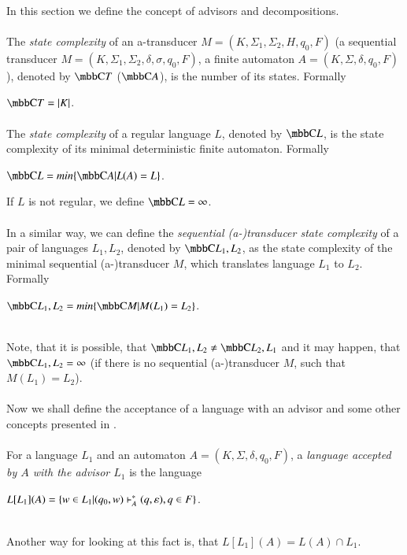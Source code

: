 \paragraph{}
In this section we define the concept of advisors and decompositions.

\paragraph{}
 The \emph{state complexity} of an a-transducer $M = (K, \Sigma_1, \Sigma_2, H, q_0, F)$ (a sequential transducer $M = (K, \Sigma_1, \Sigma_2, \delta, \sigma, q_0, F)$, a finite automaton $A = (K, \Sigma, \delta, q_0, F)$), denoted by $\C{T}$ ($\C{A}$), is the number of its states. Formally \\
\centerline{$\C{T} = |K|$.}

\paragraph{}
 The \emph{state complexity} of a regular language $L$, denoted by $\C{L}$, is the state complexity of its minimal deterministic finite automaton. Formally \\
\centerline{$\C{L} = min\{ \C{A}|L(A) = L\} $.}

If $L$ is not regular, we define $\C{L} = \infty $.

\paragraph{}
 In a similar way, we can define the \emph{sequential (a-)transducer state complexity} of a pair of languages $L_1, L_2$, denoted by $\C{L_1,L_2}$, as the state complexity of the minimal sequential (a-)transducer $M$, which translates language $L_1$ to $L_2$. Formally \\
\centerline{$\C{L_1, L_2} = min\{ \C{M}|M(L_1) = L_2\} $.} \\
Note, that it is possible, that $\C{L_1,L_2} \neq \C{L_2,L_1}$ and it may happen, that $\C{L_1,L_2} \allowbreak  = \infty$ (if there is no sequential (a-)transducer $M$, such that $M(L_1) = L_2$).

\paragraph{}
Now we shall define the acceptance of a language with an advisor and some other concepts presented in \cite{Gazi}.

\paragraph{}
 For a language $L_1$ and an automaton $A = (K, \Sigma, \delta, q_0, F)$, a \emph{language accepted by $A$ with the advisor $L_1$} is the language \\
\centerline{$L[L_1](A) =  \{ w \in L_1 | (q_0, w) \vdash^\ast_A (q, \varepsilon), q \in F \}$.}\\
Another way for looking at this fact is, that $L[L_1](A) = L(A) \cap L_1$.
 
